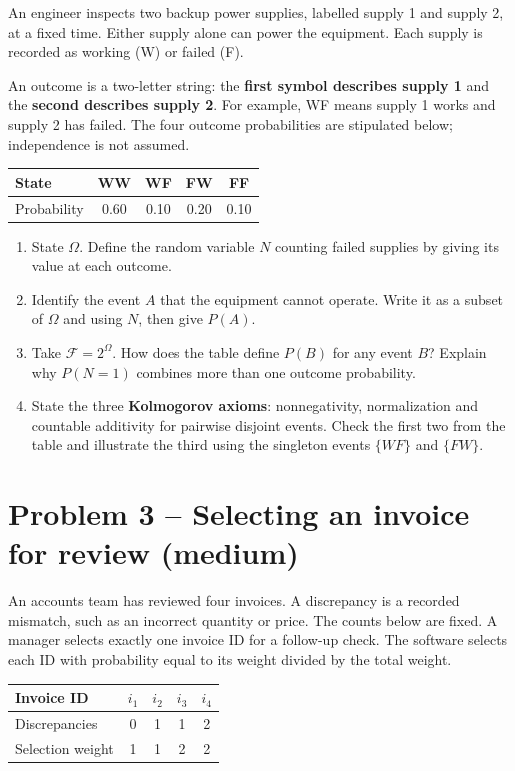 \documentclass[11pt,a4paper]{article}
\begin{document}
An engineer inspects two backup power supplies, labelled supply 1 and supply 2, at a fixed time. Either supply alone can power the equipment. Each supply is recorded as working (W) or failed (F).

An outcome is a two-letter string: the \textbf{first symbol describes supply 1} and the \textbf{second describes supply 2}. For example, WF means supply 1 works and supply 2 has failed. The four outcome probabilities are stipulated below; independence is not assumed.

\begin{center}\begin{tabular}{lcccc}\toprule
State & WW & WF & FW & FF \\
\midrule
Probability & 0.60 & 0.10 & 0.20 & 0.10 \\
\bottomrule\end{tabular}\end{center}

\begin{enumerate}
\item State $\Omega$. Define the random variable $N$ counting failed supplies by giving its value at each outcome.
\item Identify the event $A$ that the equipment cannot operate. Write it as a subset of $\Omega$ and using $N$, then give $P(A)$.
\item Take $\mathcal F=2^\Omega$. How does the table define $P(B)$ for any event $B$? Explain why $P(N=1)$ combines more than one outcome probability.
\item State the three \textbf{Kolmogorov axioms}: nonnegativity, normalization and countable additivity for pairwise disjoint events. Check the first two from the table and illustrate the third using the singleton events $\{WF\}$ and $\{FW\}$.
\end{enumerate}

\clearpage
\section*{Problem 3 -- Selecting an invoice for review (medium)}

An accounts team has reviewed four invoices. A discrepancy is a recorded mismatch, such as an incorrect quantity or price. The counts below are fixed. A manager selects exactly one invoice ID for a follow-up check. The software selects each ID with probability equal to its weight divided by the total weight.

\begin{center}\begin{tabular}{lcccc}\toprule
Invoice ID & $i_1$ & $i_2$ & $i_3$ & $i_4$ \\
\midrule
Discrepancies & 0 & 1 & 1 & 2 \\
Selection weight & 1 & 1 & 2 & 2 \\
\bottomrule\end{tabular}\end{center}
\end{document}

